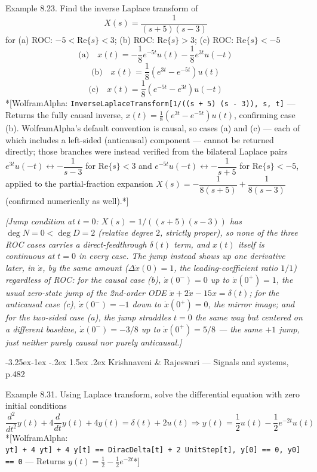\documentclass[
  11pt,
]{article}
\makeatletter
\providecommand{\implies}{\Longrightarrow}
\renewcommand\paragraph{\@startsection{paragraph}{4}{\z@}%
                                     {-3.25ex\@plus -1ex \@minus -.2ex}%
                                     {1.5ex \@plus .2ex}%
                                     {\normalfont\normalsize\bfseries}}
\makeatother
\begin{document}
Example 8.23. Find the inverse Laplace transform of \[
X(s) = \frac{1}{(s+5)(s-3)}
\] for (a) ROC: \(-5 < \text{Re}\{s\} < 3\); (b) ROC:
\(\text{Re}\{s\} > 3\); (c) ROC: \(\text{Re}\{s\} < -5\) \[
\text{(a)}\quad x(t) = -\frac{1}{8}e^{-5t}u(t) - \frac{1}{8}e^{3t}u(-t)
\] \[
\text{(b)}\quad x(t) = \frac{1}{8}\left(e^{3t} - e^{-5t}\right)u(t)
\] \[
\text{(c)}\quad x(t) = \frac{1}{8}\left(e^{-5t} - e^{3t}\right)u(-t)
\] *{[}WolframAlpha:
\texttt{InverseLaplaceTransform{[}1/((s\ +\ 5)\ (s\ -\ 3)),\ s,\ t{]}}
--- Returns the fully causal inverse,
\(x(t) = \frac{1}{8}\left(e^{3t} - e^{-5t}\right)u(t)\), confirming case
(b). WolframAlpha's default convention is causal, so cases (a) and (c)
--- each of which includes a left-sided (anticausal) component ---
cannot be returned directly; those branches were instead verified from
the bilateral Laplace pairs
\(e^{3t}u(-t) \leftrightarrow -\dfrac{1}{s-3}\) for \(\text{Re}\{s\}<3\)
and \(e^{-5t}u(-t) \leftrightarrow -\dfrac{1}{s+5}\) for
\(\text{Re}\{s\}<-5\), applied to the partial-fraction expansion
\(X(s) = -\dfrac{1}{8(s+5)} + \dfrac{1}{8(s-3)}\) (confirmed numerically
as well).*{]}

\emph{{[}Jump condition at \(t=0\): \(X(s)=1/((s+5)(s-3))\) has
\(\deg N=0 < \deg D=2\) (relative degree \(2\), strictly proper), so
none of the three ROC cases carries a direct-feedthrough \(\delta(t)\)
term, and \(x(t)\) itself is continuous at \(t=0\) in every case. The
jump instead shows up one derivative later, in \(\dot x\), by the same
amount (\(\Delta\dot x(0)=1\), the leading-coefficient ratio \(1/1\))
regardless of ROC: for the causal case (b), \(\dot x(0^-)=0\) up to
\(\dot x(0^+)=1\), the usual zero-state jump of the 2nd-order ODE
\(\ddot x+2\dot x-15x=\delta(t)\); for the anticausal case (c),
\(\dot x(0^-)=-1\) down to \(\dot x(0^+)=0\), the mirror image; and for
the two-sided case (a), the jump straddles \(t=0\) the same way but
centered on a different baseline, \(\dot x(0^-)=-3/8\) up to
\(\dot x(0^+)=5/8\) --- the same \(+1\) jump, just neither purely causal
nor purely anticausal.{]}}

\hypertarget{krishnaveni-rajeswari-signals-and-systems-p.482}{%
\paragraph{Krishnaveni \& Rajeswari --- Signals and systems,
p.482}\label{krishnaveni-rajeswari-signals-and-systems-p.482}}

Example 8.31. Using Laplace transform, solve the differential equation
with zero initial conditions \[
\frac{d^2}{dt^2}y(t) + 4\frac{d}{dt}y(t) + 4y(t) = \delta(t) + 2u(t) \implies y(t) = \frac{1}{2}u(t) - \frac{1}{2}e^{-2t}u(t)
\] *{[}WolframAlpha:
\texttt{y\textquotesingle{}\textquotesingle{}{[}t{]}\ +\ 4\ y\textquotesingle{}{[}t{]}\ +\ 4\ y{[}t{]}\ ==\ DiracDelta{[}t{]}\ +\ 2\ UnitStep{[}t{]},\ y{[}0{]}\ ==\ 0,\ y\textquotesingle{}{[}0{]}\ ==\ 0}
--- Returns \(y(t) = \frac{1}{2} - \frac{1}{2}e^{-2t}\)*{]}
\end{document}
